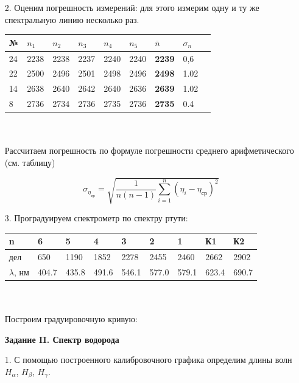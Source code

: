 \documentclass[12pt]{report}
\begin{document}
\begin{enumerate}
\item[2.] Оценим погрешность измерений: для этого измерим
одну и ту же спектральную линию несколько раз.

{
    \centering
    \begin{tabularx}{0.937\textwidth}{|X|X|X|X|X|X|X|X|X|}
        \hline
        № & $n_1$ & $n_2$ & $n_3$ & $n_4$ & $n_5$ & $\overline{n}$ & $\sigma_n$ \\
        \hline
        24 & 2238 & 2238 & 2237 & 2240 & 2240 & \textbf{2239} & 0,6 \\
        \hline
        22 & 2500 & 2496 & 2501 & 2498 & 2496 & \textbf{2498} & 1.02 \\
        \hline
        14 & 2638 & 2640 & 2642 & 2640 & 2636 & \textbf{2639} & 1.02 \\
        \hline
        8 & 2736 & 2734 & 2736 & 2735 & 2736 & \textbf{2735} & 0.4 \\
        \hline
    \end{tabularx}
}
\\
\\

Рассчитаем погрешность по формуле погрешности среднего арифметического (см. таблицу)

\begin{equation}
\label{e2}
    \sigma_{\eta_\text{ср}} = \sqrt{\frac{1}{n(n-1)} \sum\limits_{i=1}^n (\eta_i - \eta_\text{ср})^2}
\end{equation}

\item[3.] Проградуируем спектрометр по спектру ртути:

{
    \centering
    \begin{tabularx}{0.937\textwidth}{|X|X|X|X|X|X|X|X|X|}
        \hline
        n & 6 & 5 & 4 & 3 & 2 & 1 & К1 & К2 \\
        \hline
        дел & 650 & 1190 & 1852 & 2278 & 2455 & 2460 & 2662 & 2902 \\
        \hline
        $\lambda$, нм & 404.7 & 435.8 & 491.6 & 546.1 & 577.0 & 579.1 & 623.4 & 690.7 \\
        \hline
    \end{tabularx}
}
\\
\\

Построим градуировочную кривую:



\textbf{Задание II. Спектр водорода}

\item[1.] С помощью построенного калибровочного графика определим длины волн $H_\alpha$, $H_\beta$, $H_\gamma$.


\end{enumerate}
\end{document}
